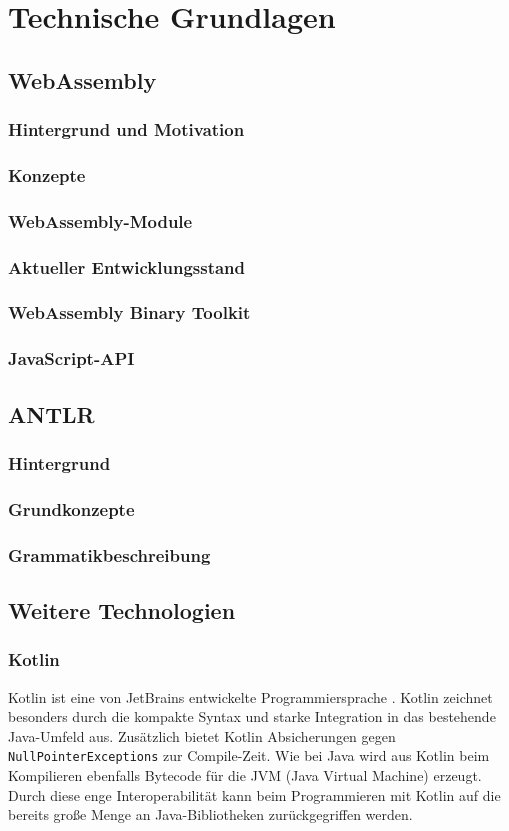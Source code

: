 \chapter{Technische Grundlagen}

\section{WebAssembly}
\subsection{Hintergrund und Motivation}
\subsection{Konzepte}
\subsection{WebAssembly-Module}
\subsection{Aktueller Entwicklungsstand}
\subsection{WebAssembly Binary Toolkit}
\subsection{JavaScript-API}

\section{ANTLR}
\subsection{Hintergrund}
\subsection{Grundkonzepte}
\subsection{Grammatikbeschreibung}

\section{Weitere Technologien}
\subsection{Kotlin}
Kotlin ist eine von JetBrains entwickelte Programmiersprache \cite{KotlinReference}. Kotlin zeichnet besonders durch die kompakte Syntax und starke Integration in das bestehende Java-Umfeld aus. Zusätzlich bietet Kotlin Absicherungen gegen \lstinline{NullPointerExceptions} zur Compile-Zeit. Wie bei Java wird aus Kotlin beim Kompilieren ebenfalls Bytecode für die JVM (Java Virtual Machine) erzeugt. Durch diese enge Interoperabilität kann beim Programmieren mit Kotlin auf die bereits große Menge an Java-Bibliotheken zurückgegriffen werden.

